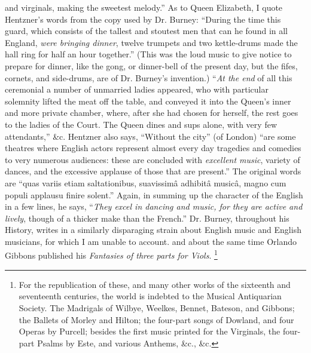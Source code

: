 {and virginals, making the sweetest melody.” As to
Queen Elizabeth, I quote Hentzner’s words from the copy
used by Dr. Burney: “During the time this guard, which
consists of the tallest and stoutest men that can he found
in all England, \textit{were bringing dinner}, twelve trumpets and
two kettle-drums made the hall ring for half an hour together.” 
(This was the loud music to give notice to prepare
for dinner, like the gong, or dinner-bell of the present
day, but the fifes, cornets, and side-drums, are of Dr.
Burney's invention.) “\textit{At the end} of all this ceremonial
a number of unmarried ladies appeared, who with particular
solemnity lifted the meat off the table, and conveyed
it into the Queen's inner and more private chamber, where,
after she had chosen for herself, the rest goes to the ladies
of the Court. The Queen dines and sups alone, with very
few attendants,” \&c. Hentzner also says, “Without the
city” (of London) “are some theatres where English
actors represent almost every day tragedies and comedies
to very numerous audiences: these are concluded with
\textit{excellent music}, variety of dances, and the excessive
applause of those that are present.” The original words
are “quas variis etiam saltationibus, suavissimâ adhibitâ
musicâ, magno cum populi applausu finire solent.” Again,
in summing up the character of the English in a few
lines, he says, “\textit{They excel in dancing and music, for they
are active and lively}, though of a thicker make than the
French.” Dr. Burney, throughout his History, writes in
a similarly disparaging strain about English music and
English musicians, for which I am unable to account.}
and about the same time Orlando Gibbons
published his \textit{Fantasies of three parts for Viols}. \footnote{\tinyrrr
For the republication of these, and many other works of
the sixteenth and seventeenth centuries, the world is indebted
to the Musical Antiquarian Society. The Madrigals
of Wilbye, Weelkes, Bennet, Bateson, and Gibbons;
the Ballets of Morley and Hilton; the four-part songs of
Dowland, and four Operas by Purcell; besides the first
music printed for the Virginals, the four-part Psalms by
Este, and various Anthems, \&c., \&c.
}
\pagebreak

